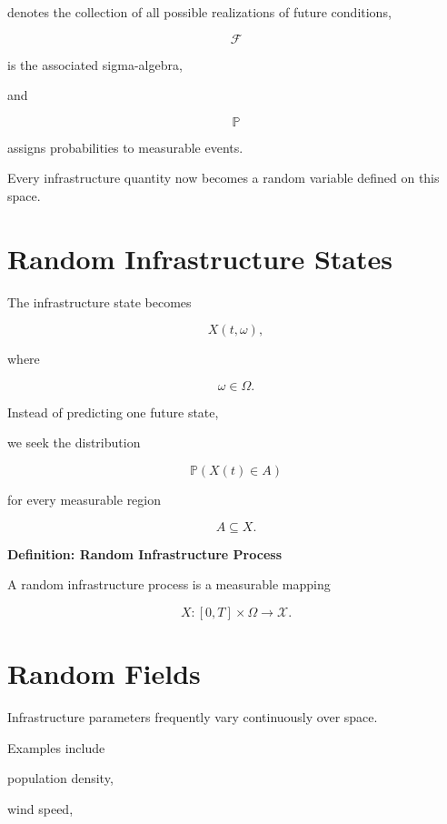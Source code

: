 \documentclass[11pt,fleqn]{book}
\numberwithin{equation}{chapter}
\newenvironment{definition}[1]
  {\begin{definitionEnv}
   \noindent\textbf{Definition: #1}\par\smallskip}
  {\end{definitionEnv}}
\theoremstyle{plain}
\theoremstyle{definition}
\theoremstyle{remark}
\begin{document}
denotes the collection of all possible realizations of future
conditions,

\[
\mathcal F
\]

is the associated sigma-algebra,

and

\[
\mathbb P
\]

assigns probabilities to measurable events.

Every infrastructure quantity now becomes a random variable defined on
this space.


\section{Random Infrastructure States}

The infrastructure state becomes

\[
X(t,\omega),
\]

where

\[
\omega\in\Omega.
\]

Instead of predicting one future state,

we seek the distribution

\[
\mathbb P(X(t)\in A)
\]

for every measurable region

\[
A\subseteq X.
\]


\begin{definition}{Random Infrastructure Process}

A random infrastructure process is a measurable mapping

\[
X:[0,T]\times\Omega\rightarrow\mathcal X.
\]

\end{definition}


\section{Random Fields}

Infrastructure parameters frequently vary continuously over space.

Examples include

population density,

wind speed,
\end{document}
